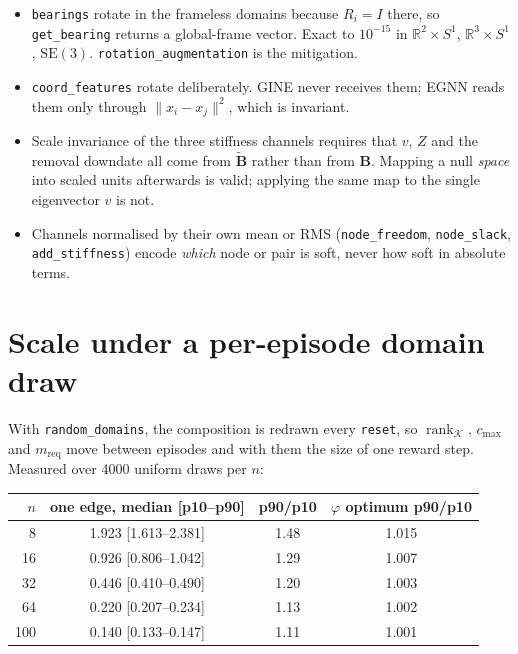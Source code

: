 \documentclass[11pt,a4paper]{article}
\newcommand{\R}{\mathbb{R}}
\newcommand{\SEthree}{\mathrm{SE}(3)}
\newcommand{\rk}{\operatorname{rank}}
\newcommand{\B}{\mathbf{B}}
\newcommand{\Bs}{\widetilde{\mathbf{B}}}
\begin{document}
\begin{itemize}\itemsep2pt
\item \texttt{bearings} rotate in the frameless domains because $R_i=I$ there, so
      \texttt{get\_bearing} returns a global-frame vector. Exact to $10^{-15}$ in
      $\R^2\!\times\!S^1$, $\R^3\!\times\!S^1$, $\SEthree$. \texttt{rotation\_augmentation}
      is the mitigation.
\item \texttt{coord\_features} rotate deliberately. GINE never receives them; EGNN reads
      them only through $\|x_i-x_j\|^2$, which is invariant.
\item Scale invariance of the three stiffness channels requires that $v$, $Z$ and the
      removal downdate all come from $\Bs$ rather than from $\B$. Mapping a null
      \emph{space} into scaled units afterwards is valid; applying the same map to the
      single eigenvector $v$ is not.
\item Channels normalised by their own mean or RMS (\texttt{node\_freedom},
      \texttt{node\_slack}, \texttt{add\_stiffness}) encode \emph{which} node or pair is
      soft, never how soft in absolute terms.
\end{itemize}

\section{Scale under a per-episode domain draw}

With \texttt{random\_domains}, the composition is redrawn every \texttt{reset}, so
$\rk_{\mathcal K}$, $c_{\max}$ and $m_{\text{req}}$ move between episodes and with them the
size of one reward step. Measured over 4000 uniform draws per $n$:

\begin{center}
\begin{tabular}{rccc}
\toprule
$n$ & one edge, median [p10--p90] & p90/p10 & $\varphi$ optimum p90/p10 \\
\midrule
8   & 1.923 [1.613--2.381] & 1.48 & 1.015 \\
16  & 0.926 [0.806--1.042] & 1.29 & 1.007 \\
32  & 0.446 [0.410--0.490] & 1.20 & 1.003 \\
64  & 0.220 [0.207--0.234] & 1.13 & 1.002 \\
100 & 0.140 [0.133--0.147] & 1.11 & 1.001 \\
\bottomrule
\end{tabular}
\end{center}
\end{document}
